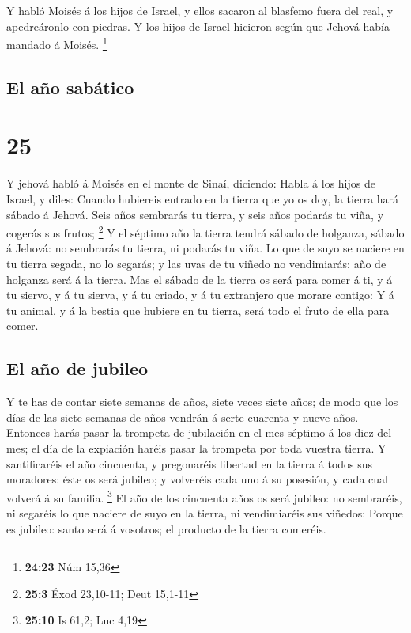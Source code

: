  Y habló Moisés á los hijos de Israel, y ellos sacaron al
blasfemo fuera del real, y apedreáronlo con piedras. Y los hijos de
Israel hicieron según que Jehová había mandado á Moisés. \footnote{\textbf{24:23}
  Núm 15,36}

\hypertarget{el-auxf1o-sabuxe1tico}{%
\subsection{El año sabático}\label{el-auxf1o-sabuxe1tico}}

\hypertarget{section-24}{%
\section{25}\label{section-24}}

 Y jehová habló á Moisés en el monte de Sinaí, diciendo:
 Habla á los hijos de Israel, y diles: Cuando hubiereis
entrado en la tierra que yo os doy, la tierra hará sábado á Jehová.
 Seis años sembrarás tu tierra, y seis años podarás tu viña,
y cogerás sus frutos; \footnote{\textbf{25:3} Éxod 23,10-11; Deut
  15,1-11}  Y el séptimo año la tierra tendrá sábado de
holganza, sábado á Jehová: no sembrarás tu tierra, ni podarás tu viña.
 Lo que de suyo se naciere en tu tierra segada, no lo
segarás; y las uvas de tu viñedo no vendimiarás: año de holganza será á
la tierra.  Mas el sábado de la tierra os será para comer á
ti, y á tu siervo, y á tu sierva, y á tu criado, y á tu extranjero que
morare contigo:  Y á tu animal, y á la bestia que hubiere en
tu tierra, será todo el fruto de ella para comer.

\hypertarget{el-auxf1o-de-jubileo}{%
\subsection{El año de jubileo}\label{el-auxf1o-de-jubileo}}

 Y te has de contar siete semanas de años, siete veces siete
años; de modo que los días de las siete semanas de años vendrán á serte
cuarenta y nueve años.  Entonces harás pasar la trompeta de
jubilación en el mes séptimo á los diez del mes; el día de la expiación
haréis pasar la trompeta por toda vuestra tierra.  Y
santificaréis el año cincuenta, y pregonaréis libertad en la tierra á
todos sus moradores: éste os será jubileo; y volveréis cada uno á su
posesión, y cada cual volverá á su familia. \footnote{\textbf{25:10} Is
  61,2; Luc 4,19}  El año de los cincuenta años os será
jubileo: no sembraréis, ni segaréis lo que naciere de suyo en la tierra,
ni vendimiaréis sus viñedos:  Porque es jubileo: santo será
á vosotros; el producto de la tierra comeréis.


